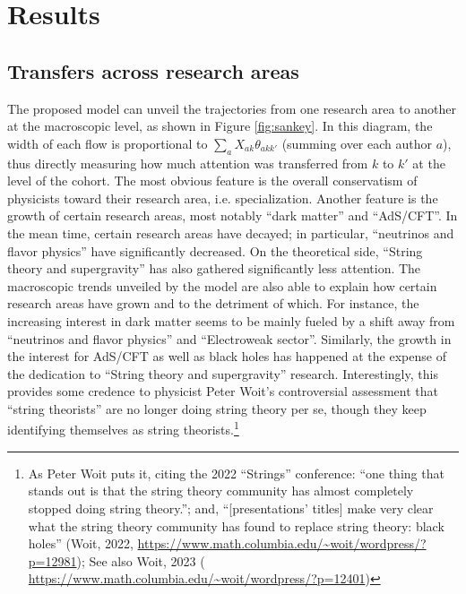\documentclass{article}
\begin{document}
 \section{\label{sec:results}Results}

 \subsection{\label{sec:macro}Transfers across research areas}

The proposed model can unveil the trajectories from one research area to another at the macroscopic level, as shown in Figure \ref{fig:sankey}. In this diagram, the width of each flow is proportional to $\sum_a X_{ak}\theta_{akk'}$ (summing over each author $a$), thus directly measuring how much attention was transferred from $k$ to $k'$ at the level of the cohort. The most obvious feature is the overall conservatism of physicists toward their research area, i.e. specialization. Another feature is the growth of certain research areas, most notably ``dark matter'' and ``AdS/CFT''. In the mean time, certain research areas have decayed; in particular, ``neutrinos and flavor physics'' have significantly decreased. %
On the theoretical side, ``String theory and supergravity'' has also gathered significantly less attention. The macroscopic trends unveiled by the model are also able to explain how certain research areas have grown and to the detriment of which. For instance, the increasing interest in dark matter seems to be mainly fueled by a shift away from ``neutrinos and flavor physics'' and ``Electroweak sector''. Similarly, the growth in the interest for AdS/CFT as well as black holes has happened at the expense of the dedication to ``String theory and supergravity'' research. Interestingly, this provides some credence to physicist Peter Woit's controversial assessment that ``string theorists'' are no longer doing string theory per se, though they keep identifying themselves as string theorists.\footnote{As Peter Woit puts it, citing the 2022 ``Strings'' conference: ``one thing that stands out is that the string theory community has almost completely stopped doing string theory.''; and, ``[presentations' titles] make very clear what the string theory community has found to replace string theory: black holes'' (Woit, 2022, \url{https://www.math.columbia.edu/~woit/wordpress/?p=12981}); See also Woit, 2023 ( \url{https://www.math.columbia.edu/~woit/wordpress/?p=12401})}
\end{document}
